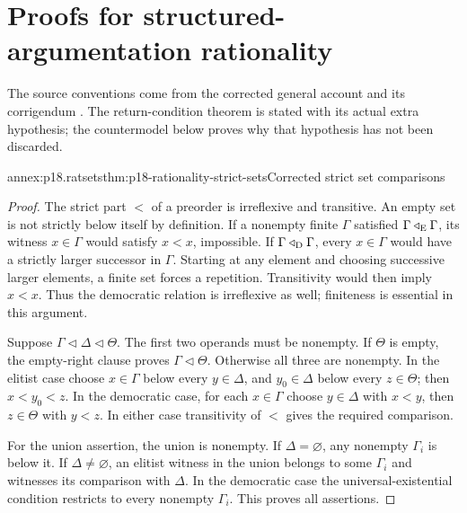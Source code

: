 \section{Proofs for structured-argumentation rationality}
\label{sec:annex-p18-structured-rationality}

The source conventions come from the corrected general account and its
corrigendum \cite{ModgilPrakken2013GeneralCorrected,ModgilPrakken2018Corrigendum}.
The return-condition theorem is stated with its actual extra hypothesis;
the countermodel below proves why that hypothesis has not been discarded.

\begin{annexitem}{annex:p18.ratsets}{thm:p18-rationality-strict-sets}{Corrected strict set comparisons}
\begin{proof}
The strict part \(<\) of a preorder is irreflexive and transitive.
An empty set is not strictly below itself by definition.
If a nonempty finite \(\Gamma\) satisfied
\(\Gamma\triangleleft_{\rm E}\Gamma\), its witness \(x\in\Gamma\)
would satisfy \(x<x\), impossible.
If \(\Gamma\triangleleft_{\rm D}\Gamma\), every \(x\in\Gamma\)
would have a strictly larger successor in \(\Gamma\).
Starting at any element and choosing successive larger elements, a finite
set forces a repetition. Transitivity would then imply \(x<x\).
Thus the democratic relation is irreflexive as well; finiteness is
essential in this argument.

Suppose \(\Gamma\triangleleft\Delta\triangleleft\Theta\).
The first two operands must be nonempty. If \(\Theta\) is empty, the
empty-right clause proves \(\Gamma\triangleleft\Theta\).
Otherwise all three are nonempty. In the elitist case choose
\(x\in\Gamma\) below every \(y\in\Delta\), and \(y_0\in\Delta\)
below every \(z\in\Theta\); then \(x<y_0<z\).
In the democratic case, for each \(x\in\Gamma\) choose \(y\in\Delta\)
with \(x<y\), then \(z\in\Theta\) with \(y<z\). In either case
transitivity of \(<\) gives the required comparison.

For the union assertion, the union is nonempty.
If \(\Delta=\varnothing\), any nonempty \(\Gamma_i\) is below it.
If \(\Delta\ne\varnothing\), an elitist witness in the union belongs
to some \(\Gamma_i\) and witnesses its comparison with \(\Delta\).
In the democratic case the universal-existential condition restricts
to every nonempty \(\Gamma_i\). This proves all assertions.
\end{proof}
\end{annexitem}


